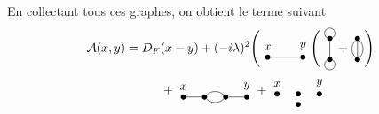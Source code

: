 \documentclass{article}
\numberwithin{equation}{section}
\theoremstyle{solution}
\begin{document}
En collectant tous ces graphes, on obtient le terme suivant
\begin{equation}
\begin{aligned}
        \mathcal{A}(x, y) &= D_F(x - y) + (-i \lambda)^{2} \Biggl( 
\begin{tikzpicture}[baseline={([yshift=-.5ex]current bounding box.center)}, scale=0.5]
        \node[circle, fill=black, inner sep=1.5pt, label=above:{$x$}] (x) at (0, 0) {};
        \node[circle, fill=black, inner sep=1.5pt, label=above:{$y$}] (y) at (2, 0) {};
        \draw (x) edge (y);
\end{tikzpicture}
\Biggl(
\,\,
\begin{tikzpicture}[baseline={([yshift=-.5ex]current bounding box.center)}, scale=0.3]
\begin{scope}[rotate=90]
        \node[circle, fill=black, inner sep=1.5pt] (z) at (0, 0) {};
        \node[circle, fill=black, inner sep=1.5pt] (w) at (2, 0) {};
        \draw (z) edge (w);
        \draw (2.5, 0) circle (.5);
        \draw (-.5, 0) circle (.5);
\end{scope}
\end{tikzpicture}
+
\begin{tikzpicture}[baseline={([yshift=-.5ex]current bounding box.center)}, scale=0.3]
\begin{scope}[shift={(1, 0)}]
        \node[circle, fill=black, inner sep=1.5pt] (z) at (0, 0) {};
        \node[circle, fill=black, inner sep=1.5pt] (w) at (0, 2) {};
        \draw[out=45, in=-45] (z) edge (w);
        \draw[out=135, in=-135] (z) edge (w);
        \draw (z) edge (w);
\end{scope}
\end{tikzpicture}
\Biggl)\\
&\hspace{1cm}+ 
\begin{tikzpicture}[baseline={([yshift=-.5ex]current bounding box.center)}, scale=0.3]
        \node[circle, fill=black, inner sep=1.5pt, label=above:{$x$}] (x) at (-3, 0) {};
        \node[circle, fill=black, inner sep=1.5pt] (z) at (-1, 0) {};
        \node[circle, fill=black, inner sep=1.5pt] (w) at (1, 0) {};
        \node[circle, fill=black, inner sep=1.5pt, label=above:{$y$}] (y) at (3, 0) {};
        \draw (x) edge (z);
        \draw (w) edge (y);
        \draw[out=45, in=135] (z) edge (w);
        \draw[out=-45, in=-135] (z) edge (w);
\end{tikzpicture}        
+
\begin{tikzpicture}[baseline={([yshift=-.5ex]current bounding box.center)}, scale=0.3]
        \node[circle, fill=black, inner sep=1.5pt, label=above:{$x$}] (x) at (-2, 0) {};
        \node[circle, fill=black, inner sep=1.5pt] (z) at (0, 0) {};
        \node[circle, fill=black, inner sep=1.5pt] (w) at (0, -1) {};
        \node[circle, fill=black, inner sep=1.5pt, label=above:{$y$}] (y) at (2, 0) {};


\end{tikzpicture}
\end{aligned}
\end{equation}
\end{document}
